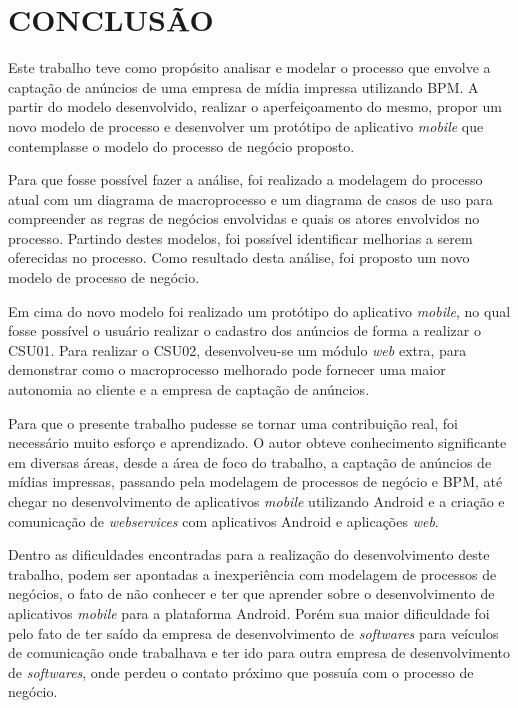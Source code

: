 \documentclass[
	12pt,				%
	openright,			%
	oneside,			%
	a4paper,			%
	chapter=TITLE,		%
	section=TITLE,		%
	english,			%
	french,				%
	spanish,			%
	brazil				%
	]{abntex2}
\begin{document}
\chapter{CONCLUSÃO}

Este trabalho teve como propósito analisar e modelar o processo que envolve a captação de anúncios de uma empresa de mídia impressa utilizando BPM. A partir do modelo desenvolvido, realizar o aperfeiçoamento do mesmo, propor um novo modelo de processo e desenvolver um protótipo de aplicativo \textit{mobile} que contemplasse o modelo do processo de negócio proposto.

Para que fosse possível fazer a análise, foi realizado a modelagem do processo atual com um diagrama de macroprocesso e um diagrama de casos de uso para compreender as regras de negócios envolvidas e quais os atores envolvidos no processo. Partindo destes modelos, foi possível identificar melhorias a serem oferecidas no processo. Como resultado desta análise, foi proposto um novo modelo de processo de negócio.

Em cima do novo modelo foi realizado um protótipo do aplicativo \textit{mobile}, no qual fosse possível o usuário realizar o cadastro dos anúncios de forma a realizar o CSU01. Para realizar o CSU02, desenvolveu-se um módulo \textit{web} extra, para demonstrar como o macroprocesso melhorado pode fornecer uma maior autonomia ao cliente e a empresa de captação de anúncios.

Para que o presente trabalho pudesse se tornar uma contribuição real, foi necessário muito esforço e aprendizado. O autor obteve conhecimento significante em diversas áreas, desde a área de foco do trabalho, a captação de anúncios de mídias impressas, passando pela modelagem de processos de negócio e BPM, até chegar no desenvolvimento de aplicativos \textit{mobile} utilizando Android e a criação e comunicação de \textit{webservices} com aplicativos Android e aplicações \textit{web}.

Dentro as dificuldades encontradas para a realização do desenvolvimento deste trabalho, podem ser apontadas a inexperiência com modelagem de processos de negócios, o fato de não conhecer e ter que aprender sobre o desenvolvimento de aplicativos \textit{mobile} para a plataforma Android. Porém sua maior dificuldade foi pelo fato de ter saído da empresa de desenvolvimento de \textit{softwares} para veículos de comunicação onde trabalhava e ter ido para outra empresa de desenvolvimento de \textit{softwares}, onde perdeu o contato próximo que possuía com o processo de negócio.
\end{document}

